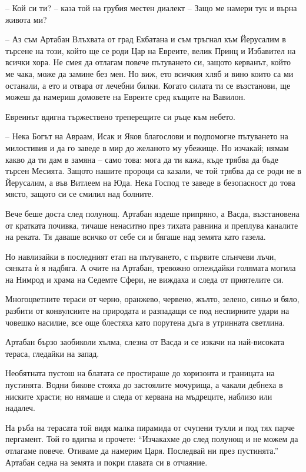 -- Кой си ти? -- каза той на грубия местен диалект -- Защо ме намери тук и върна
живота ми?

-- Аз съм Артабан Влъхвата от град Екбатана и съм тръгнал към Йерусалим в търсене
на този, който ще се роди Цар на Евреите, велик Принц и Избавител на всички
хора. Не смея да отлагам повече пътуването си, защото керванът, който ме чака,
може да замине без мен. Но виж, ето всичкия хляб и вино които са ми останали, а
ето и отвара от лечебни билки. Когато силата ти се възстанови, ще можеш да
намериш домовете на Евреите сред къщите на Вавилон.

Евреинът вдигна тържествено треперещите си ръце към небето.

-- Нека Богът на Авраам, Исак и Яков благослови и подпомогне пътуването на
милостивия и да го заведе в мир до желаното му убежище. Но изчакай; нямам какво
да ти дам в замяна -- само това: мога да ти кажа, къде трябва да бъде търсен
Месията. Защото нашите пророци са казали, че той трябва да се роди не в
Йерусалим, а във Витлеем на Юда. Нека Господ те заведе в безопасност до това
място, защото си се смилил над болните.

Вече беше доста след полунощ. Артабан яздеше припряно, а Васда, възстановена от
кратката почивка, тичаше ненаситно през тихата равнина и преплува каналите на
реката. Тя даваше всичко от себе си и бягаше над земята като газела.

Но навлизайки в последният етап на пътуването, с първите слънчеви лъчи, сянката
ѝ я надбяга. А очите на Артабан, тревожно оглеждайки голямата могила на Нимрод и
храма на Седемте Сфери, не виждаха и следа от приятелите си.

Многоцветните тераси от черно, оранжево, червено, жълто, зелено, синьо и бяло,
разбити от конвулсиите на природата и разпадащи се под неспирните удари на
човешко насилие, все още блестяха като порутена дъга в утринната светлина.

Артабан бързо заобиколи хълма, слезна от Васда и се изкачи на най-високата
тераса, гледайки на запад.

Необятната пустош на блатата се простираше до хоризонта и границата на
пустинята. Водни бикове стояха до застоялите мочурища, а чакали дебнеха в
ниските храсти; но нямаше и следа от кервана на мъдреците, наблизо или надалеч.

На ръба на терасата той видя малка пирамида от счупени тухли и под тях парче
пергамент. Той го вдигна и прочете: ``Изчакахме до след полунощ и не можем да
отлагаме повече. Отиваме да намерим Царя. Последвай ни през пустинята.'' Артабан
седна на земята и покри главата си в отчаяние.

